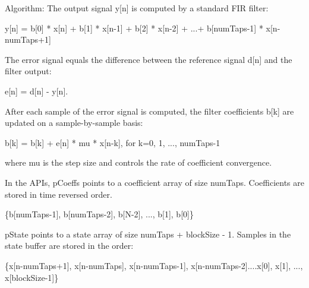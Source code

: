 \begin{DoxyParagraph}{Algorithm\+:}
The output signal {\ttfamily y\mbox{[}n\mbox{]}} is computed by a standard F\+IR filter\+: 
\begin{DoxyPre}
     y[n] = b[0] * x[n] + b[1] * x[n-1] + b[2] * x[n-2] + ...+ b[numTaps-1] * x[n-numTaps+1]
 \end{DoxyPre}

\end{DoxyParagraph}
\begin{DoxyParagraph}{}
The error signal equals the difference between the reference signal {\ttfamily d\mbox{[}n\mbox{]}} and the filter output\+: 
\begin{DoxyPre}
     e[n] = d[n] - y[n].
 \end{DoxyPre}

\end{DoxyParagraph}
\begin{DoxyParagraph}{}
After each sample of the error signal is computed, the filter coefficients {\ttfamily b\mbox{[}k\mbox{]}} are updated on a sample-\/by-\/sample basis\+: 
\begin{DoxyPre}
     b[k] = b[k] + e[n] * mu * x[n-k],  for k=0, 1, ..., numTaps-1
 \end{DoxyPre}
 where {\ttfamily mu} is the step size and controls the rate of coefficient convergence. 
\end{DoxyParagraph}
\begin{DoxyParagraph}{}
In the A\+P\+Is, {\ttfamily p\+Coeffs} points to a coefficient array of size {\ttfamily num\+Taps}. Coefficients are stored in time reversed order. 
\end{DoxyParagraph}
\begin{DoxyParagraph}{}

\begin{DoxyPre}
    \{b[numTaps-1], b[numTaps-2], b[N-2], ..., b[1], b[0]\}
 \end{DoxyPre}
 
\end{DoxyParagraph}
\begin{DoxyParagraph}{}
{\ttfamily p\+State} points to a state array of size {\ttfamily num\+Taps + block\+Size -\/ 1}. Samples in the state buffer are stored in the order\+: 
\end{DoxyParagraph}
\begin{DoxyParagraph}{}

\begin{DoxyPre}
    \{x[n-numTaps+1], x[n-numTaps], x[n-numTaps-1], x[n-numTaps-2]....x[0], x[1], ..., x[blockSize-1]\}
 \end{DoxyPre}
 
\end{DoxyParagraph}

